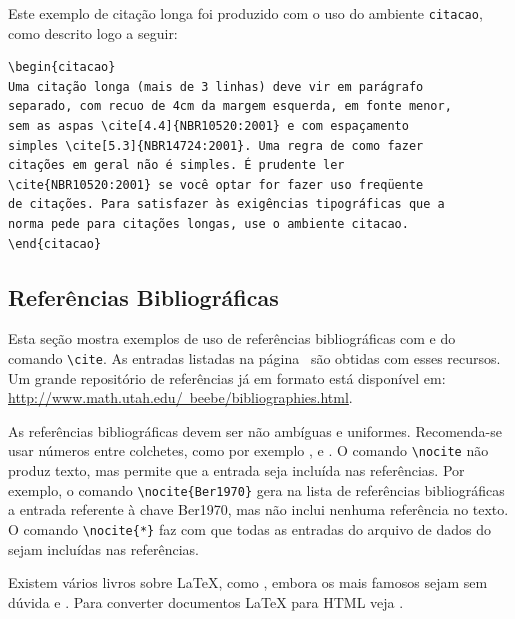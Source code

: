 Este exemplo de citação longa foi produzido com o uso do ambiente \verb|citacao|, como descrito logo a seguir:

\begin{verbatim}
\begin{citacao}
Uma citação longa (mais de 3 linhas) deve vir em parágrafo
separado, com recuo de 4cm da margem esquerda, em fonte menor,
sem as aspas \cite[4.4]{NBR10520:2001} e com espaçamento
simples \cite[5.3]{NBR14724:2001}. Uma regra de como fazer
citações em geral não é simples. É prudente ler
\cite{NBR10520:2001} se você optar for fazer uso freqüente
de citações. Para satisfazer às exigências tipográficas que a
norma pede para citações longas, use o ambiente citacao.
\end{citacao}
\end{verbatim}

\subsection{Referências Bibliográficas}
\label{sec:refs} 
Esta seção mostra exemplos de uso de referências bibliográficas com \BibTeX{} e do comando \verb|\cite|. As entradas listadas na página~\pageref{ref-bib} são obtidas com esses recursos.
Um grande repositório de referências já em formato \BibTeX{} está disponível em:
\href{http://www.math.utah.edu/~beebe/bibliographies.html}{http://www.math.utah.edu/~beebe/bibliographies.html}.

As referências bibliográficas devem ser não ambíguas e uniformes. Recomenda-se usar números entre colchetes, como por exemplo \cite{SmiJon1999}, \cite{Knu1989} e \cite{LeeSwi2002}.
O comando \verb|\nocite| não produz texto, mas permite que a entrada seja incluída nas referências. Por exemplo, o comando \verb|\nocite{Ber1970}| gera na lista de referências bibliográficas a entrada referente à chave \textsf{Ber1970}, mas não inclui nenhuma referência no texto. O comando \verb|\nocite{*}| faz com que todas as entradas do arquivo de dados do \BibTeX{} sejam incluídas nas referências. \nocite{Ber1970}

Existem vários livros sobre \LaTeX{}, como \cite{Hah1991,KopDal1995}, embora os mais famosos sejam sem dúvida \cite{Lam1996} e \cite{GooMitSam1994}. Para converter documentos \LaTeX{} para HTML veja \cite[pg.1--10]{Dra1994}.



